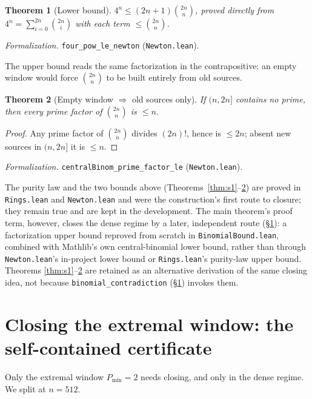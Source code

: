 \documentclass[11pt,a4paper]{amsart}
\theoremstyle{plain}
\newtheorem{theorem}{Theorem}[section]
\theoremstyle{definition}
\theoremstyle{plain}
\theoremstyle{remark}
\newcommand{\lean}[1]{\textup{\texttt{#1}}}
\newcommand{\Formal}[1]{\par\smallskip\noindent\emph{Formalization.} #1\par\smallskip}
\begin{document}
\begin{theorem}[Lower bound]\label{thm:lower}
$4^n\le(2n+1)\binom{2n}{n}$, proved directly from
$4^n=\sum_{i=0}^{2n}\binom{2n}{i}$ with each term $\le\binom{2n}{n}$.
\end{theorem}

\Formal{\lean{four\_pow\_le\_newton} (\lean{Newton.lean}).}

The upper bound reads the same factorization in the contrapositive: an empty window would
force $\binom{2n}{n}$ to be built entirely from old sources.

\begin{theorem}[Empty window $\Rightarrow$ old sources only]\label{thm:upper}
If $(n,2n]$ contains no prime, then every prime factor of $\binom{2n}{n}$ is $\le n$.
\end{theorem}

\begin{proof}
Any prime factor of $\binom{2n}{n}$ divides $(2n)!$, hence is $\le 2n$; absent new sources
in $(n,2n]$ it is $\le n$.
\end{proof}

\Formal{\lean{centralBinom\_prime\_factor\_le} (\lean{Newton.lean}).}

The purity law and the two bounds above (Theorems~\ref{thm:s1}--\ref{thm:upper}) are proved
in \lean{Rings.lean} and \lean{Newton.lean} and were the construction's first route to
closure; they remain true and are kept in the development. The main theorem's proof term,
however, closes the dense regime by a later, independent route (\S\ref{sec:erdos}): a
factorization upper bound reproved from scratch in \lean{BinomialBound.lean}, combined with
Mathlib's own central-binomial lower bound, rather than through \lean{Newton.lean}'s
in-project lower bound or \lean{Rings.lean}'s purity-law upper bound. Theorems
\ref{thm:s1}--\ref{thm:upper} are retained as an alternative derivation of the same closing
idea, not because \lean{binomial\_contradiction} (\S\ref{sec:erdos}) invokes them.

\section{Closing the extremal window: the self-contained certificate}
\label{sec:erdos}

Only the extremal window $P_{\min}=2$ needs closing, and only in the dense regime. We
split at $n=512$.
\end{document}
